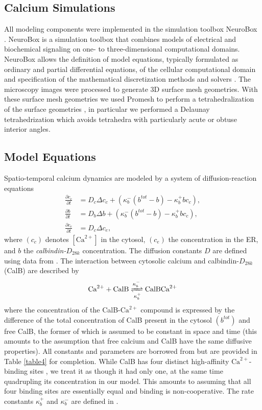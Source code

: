 \documentclass[12pt]{article}
\begin{document}
\subsection*{Calcium Simulations}
All modeling components were implemented in the simulation toolbox NeuroBox \cite{Breit2016}. NeuroBox is a simulation toolbox that combines models of electrical and biochemical signaling on one- to three-dimensional computational domains. NeuroBox allows the definition of model equations, typically formulated as ordinary and partial differential equations, of the cellular computational domain and specification of the mathematical discretization methods and solvers \cite{Vogel2013,Reiter2013}. The microscopy images were processed to generate 3D surface mesh geometries. With these surface mesh geometries we used Promesh \cite{Reiter2012} to perform a tetrahedralization of the surface geometries \cite{Si2015,Shewchuk2002}, in particular we performed a Delaunay tetrahedrization which avoids tetrahedra with particularly acute or obtuse interior angles.
\subsection*{Model Equations}
Spatio-temporal calcium dynamics are modeled by a system of diffusion-reaction equations
\begin{align}
    \frac{\partial c_c}{\partial t} &= D_c\Delta c_c + (\kappa_b^-(b^{tot}-b)-\kappa_b^+bc_c),\\
    \frac{\partial b}{\partial t} &= D_b\Delta b + (\kappa_b^-(b^{tot}-b)-\kappa_b^+bc_c),\\
    \frac{\partial c_e}{\partial t} &= D_c\Delta c_e, 
\end{align}
where $(c_c)$ denotes $[\textrm{Ca}^{2+}]$ in the cytosol, $(c_e)$ the concentration in the ER, and $b$ the \textit{calbindin-$D_{28k}$} concentration. The diffusion constants $D$ are defined using data from \cite{Allbritton1992,Schmidt2003}. The interaction between cytosolic calcium and calbindin-$D_{28k}$ (CalB) are described by  
\begin{equation}\label{eqn:eqn2}
    \textrm{Ca}^{2+}+\textrm{CalB}\xrightleftharpoons[\kappa_b^+]{\kappa_b^-} \textrm{CalB}\textrm{Ca}^{2+}
\end{equation}
where the concentration of the CalB-$\textrm{Ca}^{2+}$ compound is expressed by the difference of the total concentration of CalB present in the cytosol $(b^{tot})$ and free CalB, the former of which is assumed to be constant in space and time (this amounts to the assumption that free calcium and CalB have the same diffusive properties). All constants and parameters are borrowed from \cite{Breit2018} but are provided in Table \ref{table4} for completion.
While CalB has four distinct high-affinity $\textrm{Ca}^{2+}$-binding
sites \cite{Veenstra1997}, we treat it as though it had only one, at the same time quadrupling its concentration in our
model. This amounts to assuming that all four binding sites are essentially equal and binding is non-cooperative. The rate constants $\kappa_b^+$ and $\kappa_b^-$ are defined in \cite{Breit2018}.
\end{document}
